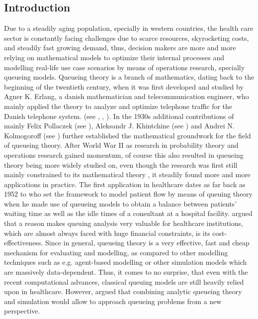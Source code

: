\documentclass[11pt,a4paper]{article}
\date{}
\begin{document}
\maketitle
\tableofcontents
\newpage
\begin{spacing}{1.8}

\subsection{Introduction}
Due to a steadily aging population, specially in western countries, the health care sector is constantly facing challenges due to scarce resources, skyrocketing costs,  and steadily fast growing demand, thus, decision makers are more and more relying on mathematical models to optimize their internal processes and modelling real-life use case scenarios by means of operations research, specially queueing models. Queueing theory is a branch of mathematics, dating back to the beginning of the twentieth century, when it was  first developed and studied by Agner K. Erlang, a danish mathematician and telecommunication engineer, who mainly applied the theory to analyze and optimize telephone traffic for the Danish telephone system. 
(see \citep{Erlang1909}, \citep{Erlang1925}, \citep{Erlang1948}). In the 1930s additional contributions of mainly Felix Pollaczek (see \citep{Pollaczek1930} \citep{Pollaczek1931}), Aleksandr J. Khintchine (see \citep{Khintchine1932}) and Andrei N. Kolmogoroff (see \citep{Kolmogoroff1931}) further established the mathematical groundwork for the  field of queueing theory.
After World War II as research in probability theory and operations research gained momentum, of course this also resulted in queueing theory being more widely studied on, even though the research was first still  mainly constrained to its mathematical theory \citep{Newell2013}, it steadily found more and more applications in practice. The first application  in healthcare dates as far back as 1952 to \citet{Bailey1952} who set the framework to model patient flow by means of queuing theory when he made use of queueing models to obtain a balance between patients' waiting time as well as the idle times of a consultant at a hospital facility. \citet{Green2006} argued that a reason makes queuing analysis very valuable for healthcare institutions, which are almost always faced with huge financial constraints,  is its cost-effectiveness. Since in general, queueing theory is a very effective, fast and cheap mechanism for evaluating and modelling, as compared to other modelling techniques such as e.g.  agent-based modelling or other simulation models which are massively data-dependent. Thus, it comes to no surprise, that even with the recent computational advances, classical queuing models are still heavily relied upon in healthcare.
However, \citet{Lakshmi2013} argued that combining analytic queueing theory and simulation would allow to approach queueing problems from a new perspective.


\end{spacing}
\end{document}
